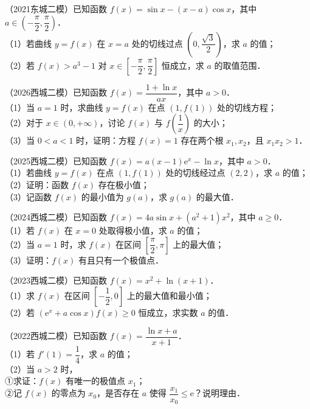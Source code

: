 \begin{example}
（2021东城二模）已知函数 $f(x)=\sin x-(x-a)\cos x$，其中 $a\in\left(-\dfrac\pi2,\dfrac\pi2\right)$．\\
（1）若曲线 $y=f(x)$ 在 $x=a$ 处的切线过点 $\left(0,\dfrac{\sqrt3}{2}\right)$，求 $a$ 的值；\\
（2）若 $f(x)>a^3-1$ 对 $x\in\left[-\dfrac\pi2,\dfrac\pi2\right]$ 恒成立，求 $a$ 的取值范围．
\end{example}

\begin{example}
（2026西城二模）已知函数 $f(x)=\dfrac{1+\ln x}{ax}$，其中 $a>0$．\\
（1）当 $a=1$ 时，求曲线 $y=f(x)$ 在点 $(1,f(1))$ 处的切线方程；\\
（2）对于 $x\in(0,+\infty)$，讨论 $f(x)$ 与 $f\left(\dfrac1x\right)$ 的大小；\\
（3）当 $0<a<1$ 时，证明：方程 $f(x)=1$ 存在两个根 $x_1,x_2$，且 $x_1x_2>1$．
\end{example}

\begin{example}
（2025西城二模）已知函数 $f(x)=a(x-1)\mathrm{e}^x-\ln x$，其中 $a>0$．\\
（1）若曲线 $y=f(x)$ 在点 $(1,f(1))$ 处的切线经过点 $(2,2)$，求 $a$ 的值；\\
（2）证明：函数 $f(x)$ 存在极小值；\\
（3）记函数 $f(x)$ 的最小值为 $g(a)$，求 $g(a)$ 的最大值．
\end{example}

\begin{example}
（2024西城二模）已知函数 $f(x)=4a\sin x+(a^2+1)x^2$，其中 $a\geqslant0$．\\
（1）若 $f(x)$ 在 $x=0$ 处取得极小值，求 $a$ 的值；\\
（2）当 $a=1$ 时，求 $f(x)$ 在区间 $\left[\dfrac\pi2,\pi\right]$ 上的最大值；\\
（3）证明：$f(x)$ 有且只有一个极值点．
\end{example}

\begin{example}
（2023西城二模）已知函数 $f(x)=x^2+\ln(x+1)$．\\
（1）求 $f(x)$ 在区间 $\left[-\dfrac12,0\right]$ 上的最大值和最小值；\\
（2）若 $(\mathrm{e}^x+a\cos x)f(x)\geqslant0$ 恒成立，求实数 $a$ 的值．
\end{example}

\begin{example}
（2022西城二模）已知函数 $f(x)=\dfrac{\ln x+a}{x+1}$．\\
（1）若 $f'(1)=\dfrac14$，求 $a$ 的值；\\
（2）当 $a>2$ 时，\\
①求证：$f(x)$ 有唯一的极值点 $x_1$；\\
②记 $f(x)$ 的零点为 $x_0$，是否存在 $a$ 使得 $\dfrac{x_1}{x_0}\leqslant \mathrm{e}$？说明理由．
\end{example}

